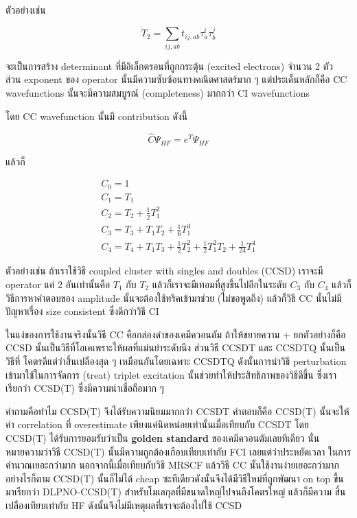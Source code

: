 ตัวอย่างเช่น 

\begin{equation}
    T_{2} = \sum_{ij,ab} t_{ij,ab} \tau^{i}_{a} \tau^{j}_{b}
\end{equation}

จะเป็นการสร้าง determinant ที่มีอิเล็กตรอนที่ถูกกระตุ้น (excited electrons) จำนวน 2 ตัว 
ส่วน exponent ของ operator นั้นมีความซับซ้อนทางคณิตศาสตร์มาก ๆ แต่ประเด็นหลักก็คือ 
CC wavefunctions นั้นจะมีความสมบูรณ์ (completeness) มากกว่า CI wavefunctions 

โดย CC wavefunction นั้นมี contribution ดังนี้ 

\begin{equation}
    \hat{C} \Psi_{HF} = e^{T} \Psi_{HF}
\end{equation}

แล้วก็

\begin{gather}
    C_{0} = 1 \\
    C_{1} = T_{1} \\
    C_{2} = T_{2} + \frac{1}{2}T^{2}_{1} \\
    C_{3} = T_{3} + T_{1}T_{2} + \frac{1}{6}T^{3}_{1} \\
    C_{4} = T_{4} + T_{1}T_{3} + \frac{1}{2}T^{2}_{2} 
        + \frac{1}{2}T^{2}_{1} T_{2} + \frac{1}{24}T^{4}_{1} 
\end{gather}

ตัวอย่างเช่น ถ้าเราใช้วิธี coupled cluster with singles and doubles (CCSD) เราจะมี 
operator แค่ 2 อันเท่านั้นคือ $T_{1}$ กับ $T_{2}$ แล้วก็เราจะมีเทอมที่สูงขึ้นไปอีกในระดับ 
$C_{3}$ กับ $C_{4}$ แล้วก็วิธีการหาคำตอบของ amplitude นั้นจะต้องใช้ทริคเข้ามาช่วย 
(ไม่ขอพูดถึง) แล้วก็วิธี CC นั้นไม่มีปัญหาเรื่อง size consistent ซึ่งดีกว่าวิธี CI 

ในแง่ของการใช้งานจริงนั้นวิธี CC คือกล่องดำของเคมีควอนตัม ถ้าให้ขยายความ + ยกตัวอย่างก็คือ 
CCSD นั้นเป็นวิธีที่โอเคเพราะให้ผลที่แม่นยำระดับนึง ส่วนวิธี CCSDT และ CCSDTQ นั้นเป็นวิธีที่%
โคตรดีแต่ว่าสิ้นเปลืองสุด ๆ เหมือนกันโดยเฉพาะ CCSDTQ ดังนั้นการนำวิธี perturbation 
เข้ามาใช้ในการจัดการ (treat) triplet excitation นั้นช่วยทำให้ประสิทธิภาพของวิธีดีขึ้น 
ซึ่งเราเรียกว่า CCSD(T) ซึ่งมีความน่าเชื่อถือมาก ๆ 

คำถามคือทำไม CCSD(T) จึงได้รับความนิยมมากกว่า CCSDT คำตอบก็คือ CCSD(T) นั้นจะให้ค่า 
correlation ที่ overestimate เพียงแค่นิดหน่อยเท่านั้นเมื่อเทียบกับ CCSDT โดย CCSD(T) 
ได้รับการยอมรับว่าเป็น \textbf{golden standard} ของเคมีควอนตัมเลยทีเดียว 
นั่นหมายความว่าวิธี CCSD(T) นั้นมีความถูกต้องเกือบเทียบเท่ากับ FCI เลยแต่ว่าประหยัดเวลา%
ในการคำนวณเยอะกว่ามาก นอกจากนี้เมื่อเทียบกับวิธี MRSCF แล้ววิธี CC นั้นใช้งานง่ายเยอะกว่ามาก 
อย่างไรก็ตาม CCSD(T) นั้นก็ไม่ได้ cheap ซะทีเดียวดังนั้นจึงได้มีวิธีใหม่ที่ถูกพัฒนา on top 
ขึ้นมาเรียกว่า DLPNO-CCSD(T) สำหรับโมเลกุลที่มีขนาดใหญ่ไปจนถึงโคตรใหญ่ แล้วก็มีความ%
สิ้นเปลืองเทียบเท่ากับ HF ดังนั้นจึงไม่มีเหตุผลที่เราจะต้องไปใช้ CCSD 